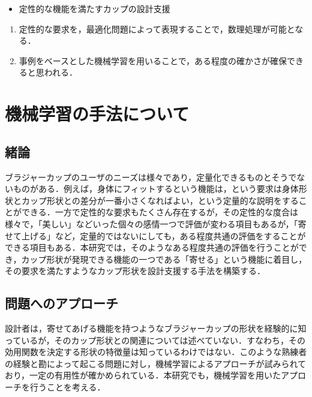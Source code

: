 \documentclass[11pt]{jsarticle}
\begin{document}
	\articleSPRabst
		\begin{itemize}
			\item 定性的な機能を満たすカップの設計支援
		\end{itemize}
		
		
	\articleSPRobj
		\begin{enumerate}
			\item 定性的な要求を，最適化問題によって表現することで，数理処理が可能となる．
			\item 事例をベースとした機械学習を用いることで，ある程度の確かさが確保できると思われる．
		\end{enumerate}
	\articleSPRitemsone
		
		\tableofcontents
		
		
	\articleSPRitemstwo
\renewcommand{\labelitemi}{$\blacktriangledown$}
	\section{機械学習の手法について}
		\subsection{緒論}
			ブラジャーカップのユーザのニーズは様々であり，定量化できるものとそうでないものがある．例えば，身体にフィットするという機能は，という要求は身体形状とカップ形状との差分が一番小さくなればよい，という定量的な説明をすることができる．一方で定性的な要求もたくさん存在するが，その定性的な度合は様々で，「美しい」などいった個々の感情一つで評価が変わる項目もあるが，「寄せて上げる」など，定量的ではないにしても，ある程度共通の評価をすることができる項目もある．本研究では，そのようなある程度共通の評価を行うことができ，カップ形状が発現できる機能の一つである「寄せる」という機能に着目し，その要求を満たすようなカップ形状を設計支援する手法を構築する．
		\subsection{問題へのアプローチ}	
			設計者は，寄せてあげる機能を持つようなブラジャーカップの形状を経験的に知っているが，そのカップ形状との関連については述べていない．すなわち，その効用関数を決定する形状の特徴量は知っているわけではない．このような熟練者の経験と勘によって起こる問題に対し，機械学習によるアプローチが試みられており，一定の有用性が確かめられている．本研究でも，機械学習を用いたアプローチを行うことを考える．
\end{document}
